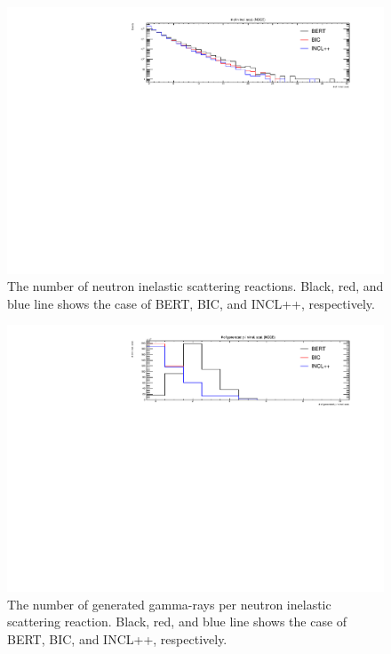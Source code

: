 \begin{figure}[H]
	\centering
	\includegraphics[width=16cm]{PDF/Secondary/Comparison/onlyNCQE_neutron/pdf1/Logy_NumIne}
	\caption[The number of neutron inelastic scattering reactions]{
	The number of neutron inelastic scattering reactions.
	Black, red, and blue line shows the case of BERT, BIC, and INCL++, respectively.
	}\label{neutron_Logy_NumIne}
\end{figure}

\begin{figure}[H]
	\centering
	\includegraphics[width=16cm]{PDF/Secondary/Comparison/onlyNCQE_gamma/pdf1/NumSecIne}
	\caption[The number of generated gamma-rays per neutron inelastic scattering reaction]{
	The number of generated gamma-rays per neutron inelastic scattering reaction.
	Black, red, and blue line shows the case of BERT, BIC, and INCL++, respectively.
	}\label{gamma_NumSecIne}
\end{figure}

